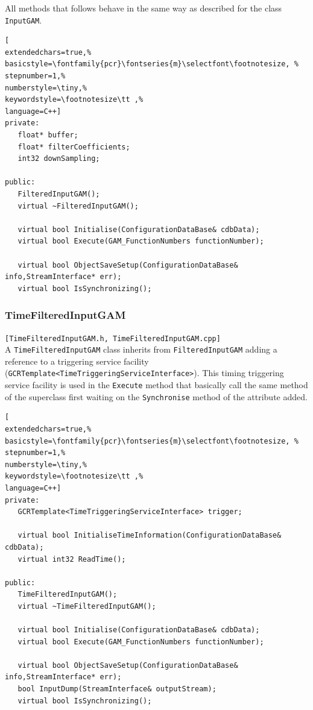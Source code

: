 All methods that follows behave in the same way as described for the class \texttt{InputGAM}.

\begin{lstlisting}[
extendedchars=true,%
basicstyle=\fontfamily{pcr}\fontseries{m}\selectfont\footnotesize, %
stepnumber=1,%
numberstyle=\tiny,%
keywordstyle=\footnotesize\tt ,%
language=C++]
private:
   float* buffer;
   float* filterCoefficients;
   int32 downSampling;

public:
   FilteredInputGAM();
   virtual ~FilteredInputGAM();

   virtual bool Initialise(ConfigurationDataBase& cdbData);
   virtual bool Execute(GAM_FunctionNumbers functionNumber);

   virtual bool ObjectSaveSetup(ConfigurationDataBase& info,StreamInterface* err);
   virtual bool IsSynchronizing();
\end{lstlisting}



\subsubsection{TimeFilteredInputGAM}
\texttt{[TimeFilteredInputGAM.h, TimeFilteredInputGAM.cpp]}\\
A \texttt{TimeFilteredInputGAM} class inherits from \texttt{FilteredInputGAM} adding a reference to a triggering service facility (\texttt{GCRTemplate<TimeTriggeringServiceInterface>}).
This timing triggering service facility is used in the \texttt{Execute} method that basically call the same method of the superclass first waiting on the \texttt{Synchronise} method of the attribute added.

\begin{lstlisting}[
extendedchars=true,%
basicstyle=\fontfamily{pcr}\fontseries{m}\selectfont\footnotesize, %
stepnumber=1,%
numberstyle=\tiny,%
keywordstyle=\footnotesize\tt ,%
language=C++]
private:
   GCRTemplate<TimeTriggeringServiceInterface> trigger;

   virtual bool InitialiseTimeInformation(ConfigurationDataBase& cdbData);
   virtual int32 ReadTime();

public:
   TimeFilteredInputGAM();
   virtual ~TimeFilteredInputGAM();

   virtual bool Initialise(ConfigurationDataBase& cdbData);
   virtual bool Execute(GAM_FunctionNumbers functionNumber);

   virtual bool ObjectSaveSetup(ConfigurationDataBase& info,StreamInterface* err);
   bool InputDump(StreamInterface& outputStream);
   virtual bool IsSynchronizing();
\end{lstlisting}



